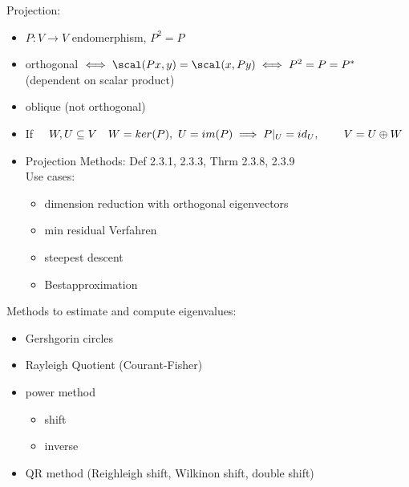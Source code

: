 
\begin{SolutionSheet}[\ref{sheet9}]
\begin{onehalfspace}

  \begin{Solution} Projection:
    \begin{itemize}
      \item $P: V \to V$ endomerphism, $P^2 = P$
      \item orthogonal $\iff \scal(Px,y) = \scal(x,Py) \iff P^2=P=P^*$ 
      (dependent on scalar product) 
      \item oblique (not orthogonal) 
      \item If $\quad W,U \subseteq V \quad W = ker(P), \ U = im(P)\\
      \implies P|_U = id_U, \\
      \phantom{\implies} V = U \oplus W$
      \item Projection Methods: Def 2.3.1, 2.3.3, Thrm 2.3.8, 2.3.9 \\
      Use cases: \begin{itemize}
        \item dimension reduction with orthogonal eigenvectors
        \item min residual Verfahren
        \item steepest descent
        \item Bestapproximation
      \end{itemize}
  \end{itemize}
  \end{Solution}

  \begin{Solution} Methods to estimate and compute eigenvalues:
    \begin{itemize}
      \item Gershgorin circles
      \item Rayleigh Quotient (Courant-Fisher) 
      \item power method
      \begin{itemize}
        \item shift
        \item inverse
      \end{itemize}
      \item QR method (Reighleigh shift, Wilkinon shift, double shift)
    \end{itemize}
  \end{Solution}


\end{onehalfspace}
\end{SolutionSheet}
